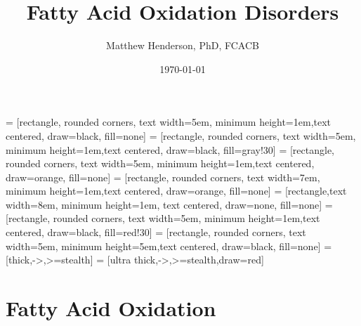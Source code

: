 \documentclass{scrartcl}
\author{Matthew Henderson, PhD, FCACB}
\date{\today}
\title{Fatty Acid Oxidation Disorders}
\begin{document}
\maketitle
\tableofcontents


 = [rectangle, rounded corners, text width=5em, minimum height=1em,text centered, draw=black, fill=none]
 = [rectangle, rounded corners, text width=5em, minimum height=1em,text centered, draw=black, fill=gray!30]
 = [rectangle, rounded corners, text width=5em, minimum height=1em,text centered, draw=orange, fill=none]
 = [rectangle, rounded corners, text width=7em, minimum height=1em,text centered, draw=orange, fill=none]
 = [rectangle,text width=8em, minimum height=1em, text centered, draw=none, fill=none]
 = [rectangle, rounded corners, text width=5em, minimum height=1em,text centered, draw=black, fill=red!30]
 = [rectangle, rounded corners, text width=5em, minimum height=5em,text centered, draw=black, fill=none]
 = [thick,->,>=stealth]
 = [ultra thick,->,>=stealth,draw=red]


\section{Fatty Acid Oxidation}
\label{sec:org7d041c2}
\end{document}
